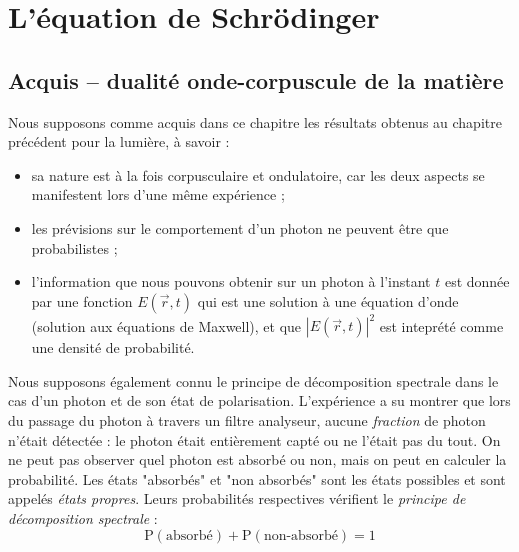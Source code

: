 \documentclass[12pt, a4paper]{book}
\author{Sami \textsc{Abdul Sater}}
\date{\hspace{-0cm}Année académique 2020-2021}
\begin{document}
\pretitle{\begin{flushleft} \fontsize{30}{34}\selectfont}
\posttitle{\end{flushleft}}
\preauthor{\begin{flushleft} \linespread{1.4} \large}
\postauthor{\end{flushleft}}
\predate{} %
\postdate{} %

\maketitle
\vfill


\thispagestyle{empty}
\restoregeometry
\tableofcontents
\chapter{L'équation de Schrödinger}
\section*{Acquis -- dualité onde-corpuscule de la matière}
Nous supposons comme acquis dans ce chapitre les résultats obtenus au chapitre précédent pour la lumière, à savoir :
\begin{itemize}
\item sa nature est à la fois corpusculaire et ondulatoire, car les deux aspects se manifestent lors d'une même expérience ;
\item les prévisions sur le comportement d'un photon ne peuvent être que probabilistes ;
\item l'information que nous pouvons obtenir sur un photon à l'instant  $t$ est donnée par une fonction $E(\vec r, t)$ qui est une solution à une équation d'onde (solution aux équations de Maxwell), et que $|E(\vec r, t)| ^2$ est inteprété comme une densité de probabilité.
\end{itemize}

Nous supposons également connu le principe de décomposition spectrale dans le cas d'un photon et de son état de polarisation. L'expérience a su montrer que lors du passage du photon à travers un filtre analyseur, aucune \textit{fraction} de photon n'était détectée : le photon était entièrement capté ou ne l'était pas du tout. On ne peut pas observer quel photon est absorbé ou non, mais on peut en calculer la probabilité. Les états "absorbés" et "non absorbés" sont les états possibles et sont appelés \textit{états propres}. Leurs probabilités respectives vérifient le \textit{principe de décomposition spectrale} :
\begin{equation}
\mathrm{P}(\text{absorbé}) + \mathrm{P}(\text{non-absorbé}) = 1
\end{equation}
\end{document}
